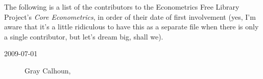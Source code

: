 

The following is a list of the contributors to the Econometrics Free
Library Project's \textit{Core Econometrics}, in order of
their date of first involvement (yes, I'm aware that it's a little
ridiculous to have this as a separate file when there is only a single
contributor, but let's dream big, shall we).

\begin{description}
\item[2009-07-01] Gray Calhoun, 
\end{description}

